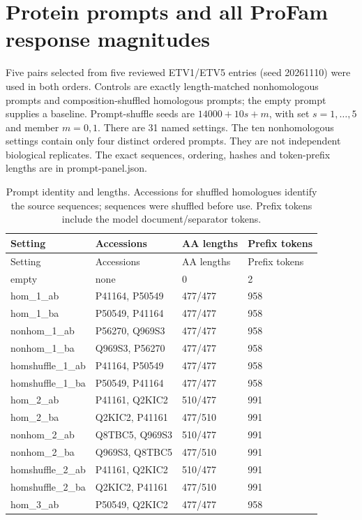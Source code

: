 \documentclass[a4paper,11pt]{scrartcl}
\begin{document}
\section{Protein prompts and all ProFam response magnitudes}
Five pairs selected from five reviewed ETV1/ETV5 entries (seed 20261110) were used in both orders. Controls are exactly length-matched nonhomologous prompts and composition-shuffled homologous prompts; the empty prompt supplies a baseline. Prompt-shuffle seeds are $14000+10s+m$, with set $s=1,\ldots,5$ and member $m=0,1$. There are 31 named settings. The ten nonhomologous settings contain only four distinct ordered prompts. They are not independent biological replicates. The exact sequences, ordering, hashes and token-prefix lengths are in \textnormal{prompt-panel.json}.


\begingroup\small
\begin{longtable}{@{}llll@{}}
\caption{Prompt identity and lengths. Accessions for shuffled homologues identify the source sequences; sequences were shuffled before use. Prefix tokens include the model document/separator tokens.}\\
\toprule Setting & Accessions & AA lengths & Prefix tokens\\\midrule\endfirsthead
\toprule Setting & Accessions & AA lengths & Prefix tokens\\\midrule\endhead
empty & none & 0 & 2\\
hom\_1\_ab & P41164, P50549 & 477/477 & 958\\
hom\_1\_ba & P50549, P41164 & 477/477 & 958\\
nonhom\_1\_ab & P56270, Q969S3 & 477/477 & 958\\
nonhom\_1\_ba & Q969S3, P56270 & 477/477 & 958\\
homshuffle\_1\_ab & P41164, P50549 & 477/477 & 958\\
homshuffle\_1\_ba & P50549, P41164 & 477/477 & 958\\
hom\_2\_ab & P41161, Q2KIC2 & 510/477 & 991\\
hom\_2\_ba & Q2KIC2, P41161 & 477/510 & 991\\
nonhom\_2\_ab & Q8TBC5, Q969S3 & 510/477 & 991\\
nonhom\_2\_ba & Q969S3, Q8TBC5 & 477/510 & 991\\
homshuffle\_2\_ab & P41161, Q2KIC2 & 510/477 & 991\\
homshuffle\_2\_ba & Q2KIC2, P41161 & 477/510 & 991\\
hom\_3\_ab & P50549, Q2KIC2 & 477/477 & 958\\

\end{longtable}
\end{document}
